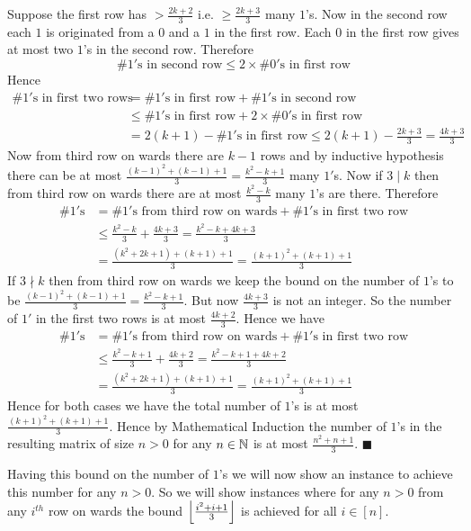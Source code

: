 \documentclass[a4paper, 11pt]{article}
\renewenvironment{proof}{\noindent{\it \textbf{Proof:}}\hspace*{1em}}{\hfill $\blacksquare$\bigskip\\}
\begin{document}
{\begin{proof}
	 Suppose the first row has $>\frac{2k+2}{3}$ i.e. $\geq \frac{2k+3}3$ many $1$'s. Now in the second row each $1$ is originated from a $0$ and a $1$ in the first row. Each $0$ in the first row gives at most two $1$'s in the second row. Therefore $$\#1'\text{s in second row}\leq 2\times \#0'\text{s in first row}$$Hence \begin{align*}
	 	\#1'\text{s in first two rows}&=\#1'\text{s in first row}+\#1'\text{s in second row}\\
	 	& \leq \#1'\text{s in first row}+2\times \#0'\text{s in first row}\\
	 	& = 2(k+1)-\#1'\text{s in first row}\leq 2(k+1)-\frac{2k+3}3  =\frac{4k+3}3
	 \end{align*}Now from third row on wards there are $k-1$ rows and by inductive hypothesis there can be at most $\frac{(k-1)^2+(k-1)+1}3=\frac{k^2-k+1}3$ many $1'$s. Now if $3\mid k$ then from third row on wards there are at most $\frac{k^2-k}3$ many $1$'s are there. Therefore \begin{align*}
	 \#1'\text{s}&=\#1'\text{s from third row on wards}+\#1'\text{s in first two  row}\\
	 & \leq \frac{k^2-k}3+\frac{4k+3}3=\frac{k^2-k+4k+3}3\\
	 &=\frac{(k^2+2k+1)+(k+1)+1}3=\frac{(k+1)^2+(k+1)+1}3
 \end{align*}
If $3\nmid k$ then from third row on wards we keep the bound on the number of $1$'s to be $\frac{(k-1)^2+(k-1)+1}3=\frac{k^2-k+1}{3}$. But now $\frac{4k+3}3$ is not an integer. So the number of $1'$ in the first two rows is at most $\frac{4k+2}3$. Hence we have  \begin{align*}
	\#1'\text{s}&=\#1'\text{s from third row on wards}+\#1'\text{s in first two  row}\\
	& \leq \frac{k^2-k+1}3+\frac{4k+2}3=\frac{k^2-k+1+4k+2}3\\
	&=\frac{(k^2+2k+1)+(k+1)+1}3=\frac{(k+1)^2+(k+1)+1}3
\end{align*}Hence for both cases we have the total number of $1$'s is at most $\frac{(k+1)^2+(k+1)+1}{3}$. Hence by Mathematical Induction the number of $1$'s in the resulting matrix of size $n>0$ for any $n\in\mathbb{N}$ is at most $\frac{n^2+n+1}{3}$.
\end{proof}

Having this bound on the number of $1$'s we will now show an instance to achieve this number for any $n>0$. So we will show instances where for any $n>0$ from any $i^{th}$ row on wards the bound $\left\lfloor \frac{i^2+i+1}{3}\right\rfloor$ is achieved for all $i\in[n]$. 

}
\end{document}
